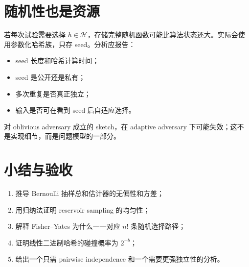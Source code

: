 \section{随机性也是资源}

若每次试验需要选择 $h\in\mathcal H$，存储完整随机函数可能比算法状态还大。实际会使用参数化哈希族，只存 seed。分析应报告：
\begin{itemize}
  \item seed 长度和哈希计算时间；
  \item seed 是公开还是私有；
  \item 多次重复是否真正独立；
  \item 输入是否可在看到 seed 后自适应选择。
\end{itemize}
对 oblivious adversary 成立的 sketch，在 adaptive adversary 下可能失效；这不是实现细节，而是问题模型的一部分。

\section{小结与验收}

\begin{checkpointbox}
\begin{enumerate}
  \item 推导 Bernoulli 抽样总和估计器的无偏性和方差；
  \item 用归纳法证明 reservoir sampling 的均匀性；
  \item 解释 Fisher--Yates 为什么一一对应 $n!$ 条随机选择路径；
  \item 证明线性二进制哈希的碰撞概率为 $2^{-b}$；
  \item 给出一个只需 pairwise independence 和一个需要更强独立性的分析。
\end{enumerate}
\end{checkpointbox}
